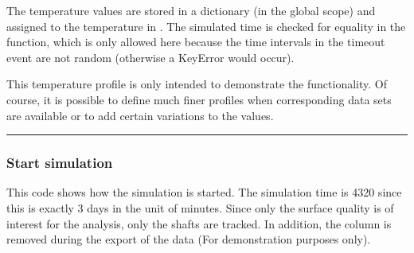 \documentclass[letterpaper,10pt,english]{sphinxmanual}
\begin{document}
\sphinxAtStartPar
The temperature values are stored in a dictionary (in the global scope) and assigned to the temperature in
. The simulated time is checked for equality in the function, which is only allowed here because the
time intervals in the timeout event are not random (otherwise a KeyError would occur).

\sphinxAtStartPar
This temperature profile is only intended to demonstrate the functionality. Of course, it is possible to define much
finer profiles when corresponding data sets are available or to add certain variations to the values.

\begin{sphinxVerbatim}[commandchars=\\\{\}]
             

  

        

      \PYG{p}{[}\PYG{p}{]}

     
\end{sphinxVerbatim}


\bigskip\hrule\bigskip



\subsubsection{Start simulation}
\label{\detokenize{source/Examples/example02:start-simulation}}\label{\detokenize{source/Examples/example02:id3}}
\sphinxAtStartPar
This code shows how the simulation is started. The simulation time is 4320 since this is exactly 3 days in the unit of
minutes. Since only the surface quality is of interest for the analysis, only the shafts are tracked. In addition, the
column  is removed during the export of the data (For demonstration purposes only).
\end{document}
